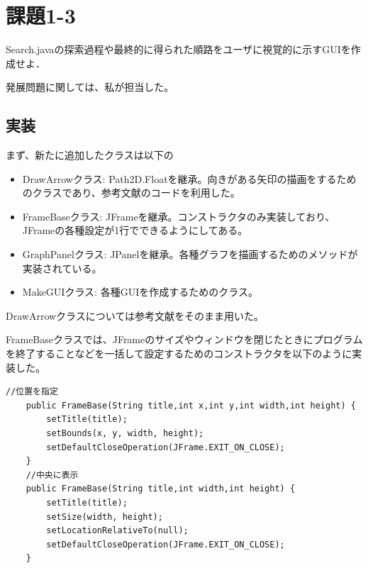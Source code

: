 ﻿\documentclass{jarticle}
\begin{document}
\section{課題1-3}
\begin{screen}
  Search.javaの探索過程や最終的に得られた順路をユーザに視覚的に示すGUIを作成せよ．
\end{screen}

発展問題に関しては、私が担当した。

\subsection{実装}
まず、新たに追加したクラスは以下の
\begin{itemize}
\item DrawArrowクラス: Path2D.Floatを継承。向きがある矢印の描画をするためのクラスであり、参考文献のコードを利用した。
\item FrameBaseクラス: JFrameを継承。コンストラクタのみ実装しており、JFrameの各種設定が1行でできるようにしてある。
\item GraphPanelクラス: JPanelを継承。各種グラフを描画するためのメソッドが実装されている。
\item MakeGUIクラス: 各種GUIを作成するためのクラス。
\end{itemize}

DrawArrowクラスについては参考文献\cite{goo}をそのまま用いた。

FrameBaseクラスでは、JFrameのサイズやウィンドウを閉じたときにプログラムを終了することなどを一括して設定するためのコンストラクタを以下のように実装した。

\begin{lstlisting}[caption=FrameBaseのコンストラクタ,label=src:FrameBase]
	//位置を指定
    public FrameBase(String title,int x,int y,int width,int height) {
		setTitle(title);
		setBounds(x, y, width, height);
		setDefaultCloseOperation(JFrame.EXIT_ON_CLOSE);
	}
	//中央に表示
	public FrameBase(String title,int width,int height) {
		setTitle(title);
		setSize(width, height);
		setLocationRelativeTo(null);
		setDefaultCloseOperation(JFrame.EXIT_ON_CLOSE);
	}
\end{lstlisting}
\end{document}
